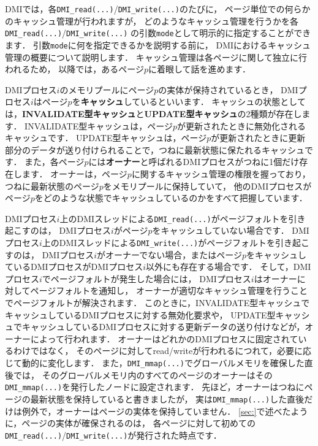 \documentclass[report,12pt]{jsbook}
\begin{document}
DMIでは，各\texttt{DMI\_read(...)}/\texttt{DMI\_write(...)}のたびに，
ページ単位での何らかのキャッシュ管理が行われますが，
どのようなキャッシュ管理を行うかを各\texttt{DMI\_read(...)}/\texttt{DMI\_write(...)}
の引数\texttt{mode}として明示的に指定することができます．
引数\texttt{mode}に何を指定できるかを説明する前に，
DMIにおけるキャッシュ管理の概要について説明します．
キャッシュ管理は各ページに関して独立に行われるため，
以降では，あるページ$p$に着眼して話を進めます．

DMIプロセス$i$のメモリプールにページ$p$の実体が保持されているとき，
DMIプロセス$i$はページ$p$を\textbf{キャッシュ}しているといいます．
キャッシュの状態としては，\textbf{INVALIDATE型キャッシュ}と\textbf{UPDATE型キャッシュ}の2種類が存在します．
INVALIDATE型キャッシュは，ページ$p$が更新されたときに無効化されるキャッシュです．
UPDATE型キャッシュは，ページ$p$が更新されたときに更新部分のデータが送り付けられることで，つねに最新状態に保たれるキャッシュです．
また，各ページ$p$には\textbf{オーナー}と呼ばれるDMIプロセスがつねに1個だけ存在します．
オーナーは，ページ$p$に関するキャッシュ管理の権限を握っており，
つねに最新状態のページ$p$をメモリプールに保持していて，
他のDMIプロセスがページ$p$をどのような状態でキャッシュしているのかをすべて把握しています．

DMIプロセス$i$上のDMIスレッドによる\texttt{DMI\_read(...)}がページフォルトを引き起こすのは，
DMIプロセス$i$がページ$p$をキャッシュしていない場合です．
DMIプロセス$i$上のDMIスレッドによる\texttt{DMI\_write(...)}がページフォルトを引き起こすのは，
DMIプロセス$i$がオーナーでない場合，またはページ$p$をキャッシュしているDMIプロセスがDMIプロセス$i$以外にも存在する場合です．
そして，DMIプロセス$i$でページフォルトが発生した場合には，
DMIプロセス$i$はオーナーに対してページフォルトを通知し，
オーナーが適切なキャッシュ管理を行うことでページフォルトが解決されます．
このときに，INVALIDATE型キャッシュでキャッシュしているDMIプロセスに対する無効化要求や，
UPDATE型キャッシュでキャッシュしているDMIプロセスに対する更新データの送り付けなどが，オーナーによって行われます．
オーナーはどれかのDMIプロセスに固定されているわけではなく，
そのページに対してread/writeが行われるにつれて，必要に応じて動的に変化します．
また，\texttt{DMI\_mmap(...)}でグローバルメモリを確保した直後では，
そのグローバルメモリ内のすべてのページのオーナーはその\texttt{DMI\_mmap(...)}を発行したノードに設定されます．
先ほど，オーナーはつねにページの最新状態を保持していると書きましたが，
実は\texttt{DMI\_mmap(...)}した直後だけは例外で，オーナーはページの実体を保持していません．
\ref{sec:}で述べたように，ページの実体が確保されるのは，
各ページに対して初めての\texttt{DMI\_read(...)}/\texttt{DMI\_write(...)}が発行された時点です．
\end{document}
